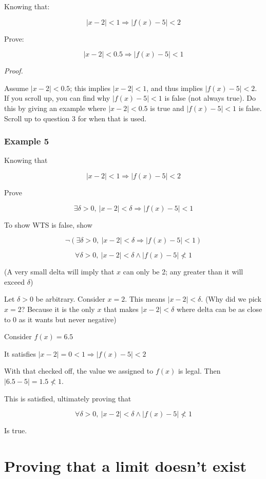 \documentclass[
]{article}
\newcounter{example}
\begin{document}
Knowing that:

$$|x - 2| < 1 \Rightarrow \left| f(x) - 5 \right| < 2$$

Prove:

$$|x - 2| < 0.5 \Rightarrow \left| f(x) - 5 \right| < 1$$

\emph{Proof.}

Assume $|x - 2| < 0.5$; this implies $|x - 2| < 1$, and thus implies
$\left| f(x) - 5 \right| < 2$. If you scroll up, you can find why
$\left| f(x) - 5 \right| < 1$ is false (not always true). Do this by
giving an example where $|x - 2| < 0.5$ is true and
$\left| f(x) - 5 \right| < 1$ is false. Scroll up to question 3 for
when that is used.


\subsubsection{Example 5}

Knowing that

$$|x - 2| < 1 \Rightarrow \left| f(x) - 5 \right| < 2$$

Prove

$$\exists\delta > 0,\ |x - 2| < \delta \Rightarrow \left| f(x) - 5 \right| < 1$$

To show WTS is false, show

$$\neg\left( \exists\delta > 0,\ |x - 2| < \delta \Rightarrow \left| f(x) - 5 \right| < 1 \right)$$

$$\forall\delta > 0,\ |x - 2| < \delta \land |f(x) - 5| \nless 1$$

(A very small delta will imply that $x$ can only be 2; any greater
than it will exceed $\delta$)

Let $\delta > 0$ be arbitrary. Consider $x = 2$. This means
$|x - 2| < \delta$. (Why did we pick $x = 2$? Because it is the only
$x$ that makes $|x - 2| < \delta$ where delta can be as close to 0
as it wants but never negative)

Consider $f(x) = 6.5$

It satisfies $|x - 2| = 0 < 1 \Rightarrow \left| f(x) - 5 \right| < 2$

With that checked off, the value we assigned to $f(x)$ is legal. Then
$|6.5 - 5| = 1.5 \nless 1$.

This is satisfied, ultimately proving that

$$\forall\delta > 0,\ |x - 2| < \delta \land |f(x) - 5| \nless 1$$

Is true.


\section{Proving that a limit doesn't
exist}
\end{document}
